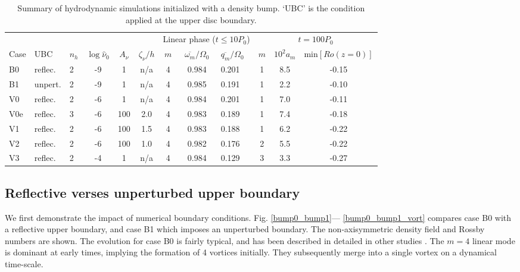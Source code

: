 \begin{table}
  \centering
  \caption{Summary of hydrodynamic simulations initialized with a
    density bump. `UBC' is
  the condition applied at the upper disc boundary. \label{artificial_bump}}
 \begin{tabular}{lllcccccl @{\extracolsep{0.1cm}} ccc}
    \hline\hline
    \multicolumn{6}{c}{\phantom{stuff}} &
    \multicolumn{3}{c}{Linear phase ($t\leq10P_0$)}&
    \multicolumn{3}{c}{$t=100P_0$}\\
    \cline{7-9}\cline{10-12}
    Case & UBC & $n_h$ & $\log{\hat{\nu}_0}$ & $A_\nu$ &$\zeta_\nu/h$ & $m$ &
    $\overline{\omega_m}/\Omega_0$ &
    $\overline{q_m}/\Omega_0$ &  
    $m$ & $10^2a_m$ & $\mathrm{min}[Ro(z=0)]$ \\ 
    \hline
    B0 & reflec. & 2 &-9 & 1 &n/a & 4 & 0.984 & 0.201 %
    & 1  & 8.5  &  -0.15  \\  
    B1 & unpert. & 2 &-9 & 1 &n/a & 4  & 0.985 & 0.191 
    & 1 &  2.2 &   -0.10 \\
    V0 & reflec. & 2 &-6 & 1 &n/a & 4  & 0.984 & 0.201   
    & 1 & 7.0 &   -0.11 \\
    V0e & reflec. & 3 &-6 & 100 &  2.0 & 4   &  0.983   &  0.189 
    & 1 & 7.4 &   -0.18 \\
    V1 & reflec. & 2 &-6 & 100 & 1.5  & 4 & 0.983  & 0.188  
    & 1  & 6.2 &  -0.22 \\
    V2 & reflec. & 2 & -6 & 100 & 1.0  & 4   &  0.982 & 0.176  
    & 2  & 5.5 &   -0.22\\
    V3 & reflec. & 2 & -4 & 1 & n/a  &   4 & 0.984  & 0.129  
    & 3  & 3.3   &  -0.27 \\
   \hline
  \end{tabular}
\end{table}


\subsection{Reflective verses unperturbed upper boundary}
We first demonstrate the impact of numerical boundary conditions. 
Fig. \ref{bump0_bump1}--- \ref{bump0_bump1_vort} compares case B0 
with a reflective upper boundary, and case B1 which imposes an
unperturbed boundary. The non-axisymmetric density field and Rossby
numbers are shown. The evolution for case B0 is fairly typical, and
has been described in detailed in other studies
\citep[e.g.][]{meheut12}. The $m=4$ linear mode is dominant at early
times, implying the formation of 4 vortices initially. They
subsequently merge into a single vortex on a dynamical time-scale. 

